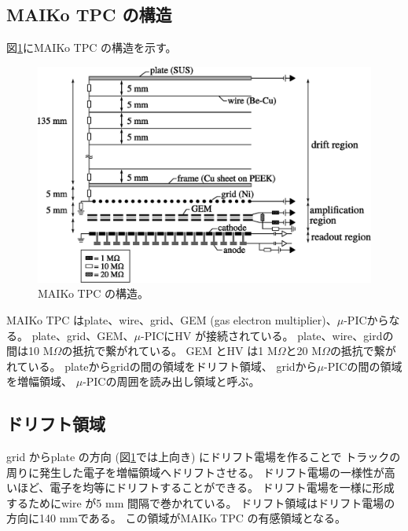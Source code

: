 \subsection{MAIKo TPC の構造}
\label{sec::maiko-cage}
図\ref{fig::MAIKo_cage}にMAIKo TPC の構造を示す。
\begin{figure}
  \centering
  \includegraphics[clip, width=\columnwidth]{eps/MAIKo_cage.eps}
  \caption{MAIKo TPC の構造。}
  \label{fig::MAIKo_cage}
\end{figure}
MAIKo TPC はplate、wire、grid、GEM (gas electron multiplier)、$\mu$-PICからなる。
plate、grid、GEM、$\mu$-PICにHV が接続されている。
plate、wire、girdの間は10 M$\Omega$の抵抗で繋がれている。
GEM とHV は1 M$\Omega$と20 M$\Omega$の抵抗で繋がれている。
plateからgridの間の領域をドリフト領域、
gridから$\mu$-PICの間の領域を増幅領域、
$\mu$-PICの周囲を読み出し領域と呼ぶ。


\subsection{ドリフト領域}
grid からplate の方向 (図\ref{fig::MAIKo_cage}では上向き) にドリフト電場を作ることで
トラックの周りに発生した電子を増幅領域へドリフトさせる。
ドリフト電場の一様性が高いほど、電子を均等にドリフトすることができる。
ドリフト電場を一様に形成するためにwire が5 mm 間隔で巻かれている。
ドリフト領域はドリフト電場の方向に140 mmである。
この領域がMAIKo TPC の有感領域となる。

